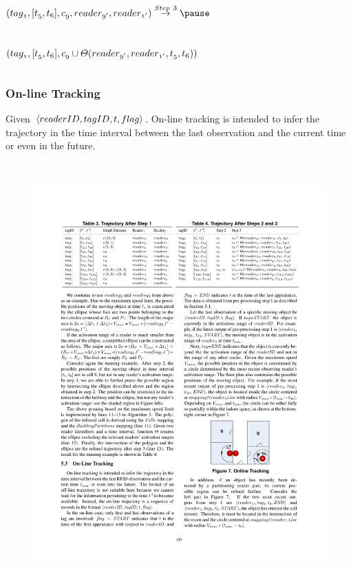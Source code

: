 \begin{frame}
\begin{columns}[c]
{  $\mathnormal{(tag_1, [t_5,t_6], c_9, reader_{9'}, reader_{1'})} \overset{Step~3}{\rightarrow} \pause$ \\~\\~\\

  $\mathnormal{(tag_1, [t_5,t_6], c_9 \cup \Theta(reader_{9'}, reader_{1'}, t_5, t_6))}$
}

\end{columns}

\end{frame}


\begin{frame}
\frametitle{On-line Tracking}

\small{\textrm{Given $\mathnormal{\langle readerID, tagID, t, flag \rangle}$. On-line tracking is intended to infer the trajectory in the time interval between the last observation and the current time or even in the future.}}
\\~\\

\begin{columns}[c]

  \begin{figure}[tb]
    \includegraphics[width=\columnwidth]{figures/2-1-13.pdf}
  \end{figure}



\end{columns}
\end{frame}
